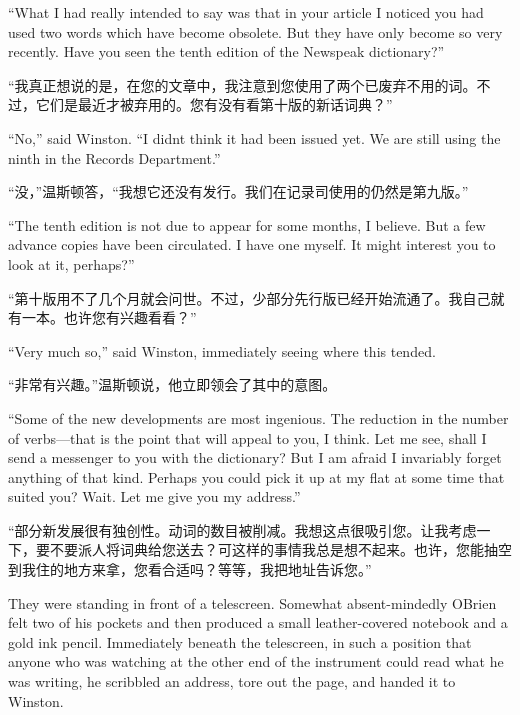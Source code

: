 \begin{paracol}{2}
\switchcolumn*

``What I had really intended to say was that in your article I noticed
you had used two words which have become obsolete. But they have only
become so very recently. Have you seen the tenth edition of the Newspeak
dictionary?''

\switchcolumn

``我真正想说的是，在您的文章中，我注意到您使用了两个已废弃不用的词。不过，它们是最近才被弃用的。您有没有看第十版的新话词典？''

\switchcolumn*

``No,'' said Winston. ``I didn\textquotesingle t think it had been issued
yet. We are still using the ninth in the Records Department.''

\switchcolumn

``没，''温斯顿答，``我想它还没有发行。我们在记录司使用的仍然是第九版。''

\switchcolumn*

``The tenth edition is not due to appear for some months, I believe. But
a few advance copies have been circulated. I have one myself. It might
interest you to look at it, perhaps?''

\switchcolumn

``第十版用不了几个月就会问世。不过，少部分先行版已经开始流通了。我自己就有一本。也许您有兴趣看看？''

\switchcolumn*

``Very much so,'' said Winston, immediately seeing where this tended.

\switchcolumn

``非常有兴趣。''温斯顿说，他立即领会了其中的意图。

\switchcolumn*

``Some of the new developments are most ingenious. The reduction in the
number of verbs---that is the point that will appeal to you, I think.
Let me see, shall I send a messenger to you with the dictionary? But I
am afraid I invariably forget anything of that kind. Perhaps you could
pick it up at my flat at some time that suited you? Wait. Let me give
you my address.''

\switchcolumn

``部分新发展很有独创性。动词的数目被削减。我想这点很吸引您。让我考虑一下，要不要派人将词典给您送去？可这样的事情我总是想不起来。也许，您能抽空到我住的地方来拿，您看合适吗？等等，我把地址告诉您。''

\switchcolumn*

They were standing in front of a telescreen. Somewhat absent-mindedly
O\textquotesingle Brien felt two of his pockets and then produced a
small leather-covered notebook and a gold ink pencil. Immediately
beneath the telescreen, in such a position that anyone who was watching
at the other end of the instrument could read what he was writing, he
scribbled an address, tore out the page, and handed it to Winston.


\end{paracol}
